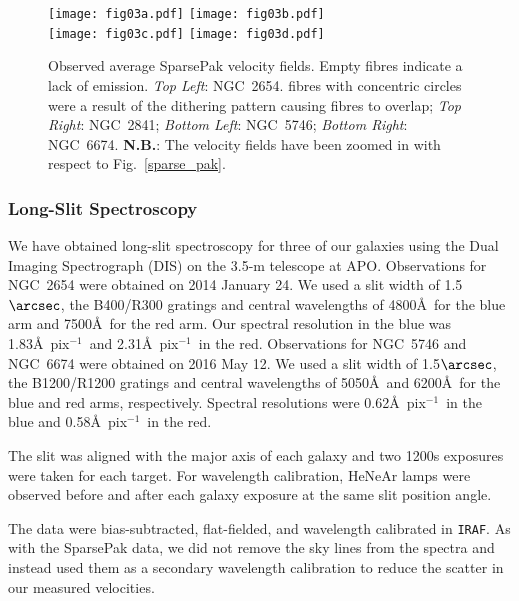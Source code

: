 \documentclass[a4paper,fleqn,usenatbib]{mnras}
\begin{document}
\begin{figure*}
	\center
	\texttt{[image: fig03a.pdf]} \hskip 2mm \texttt{[image: fig03b.pdf]}\\
	\vskip 2mm
	\texttt{[image: fig03c.pdf]} \hskip 2mm \texttt{[image: fig03d.pdf]}
	\caption{Observed average SparsePak velocity fields. Empty fibres indicate a lack of emission. \textit{Top Left}: NGC~2654. fibres with concentric circles were a result of the dithering pattern causing fibres to overlap; \textit{Top Right}: NGC~2841; \textit{Bottom Left}: NGC~5746; \textit{Bottom Right}: NGC~6674. \textbf{N.B.}: The velocity fields have been zoomed in with respect to Fig.~\ref{sparse_pak}.}
	\label{velocity_fields}
\end{figure*}

\subsubsection{Long-Slit Spectroscopy}
\label{sec:lsspec}

We have obtained long-slit spectroscopy for three of our galaxies using the Dual Imaging Spectrograph (DIS) on the 3.5-m telescope at APO. Observations for NGC~2654 were obtained on 2014 January 24. We used a slit width of 1.5$\arcsec$, the B400/R300 gratings and central wavelengths of 4800\AA\ for the blue arm and 7500\AA\ for the red arm. Our spectral resolution in the blue was 1.83\AA\ pix$^{-1}$\ and 2.31\AA\ pix$^{-1}$\ in the red. Observations for NGC~5746 and NGC~6674 were obtained on 2016 May 12. We used a slit width of 1.5$\arcsec$, the B1200/R1200 gratings and central wavelengths of 5050\AA\ and 6200\AA\ for the blue and red arms, respectively. Spectral resolutions were 0.62\AA\ pix$^{-1}$\ in the blue and 0.58\AA\ pix$^{-1}$\ in the red. 

The slit was aligned with the major axis of each galaxy and two 1200s exposures were taken for each target. For wavelength calibration, HeNeAr lamps were observed before and after each galaxy exposure at the same slit position angle. 

The data were bias-subtracted, flat-fielded, and wavelength calibrated in \texttt{IRAF}. As with the SparsePak data, we did not remove the sky lines from the spectra and instead used them as a secondary wavelength calibration to reduce the scatter in our measured velocities.
\end{document}
